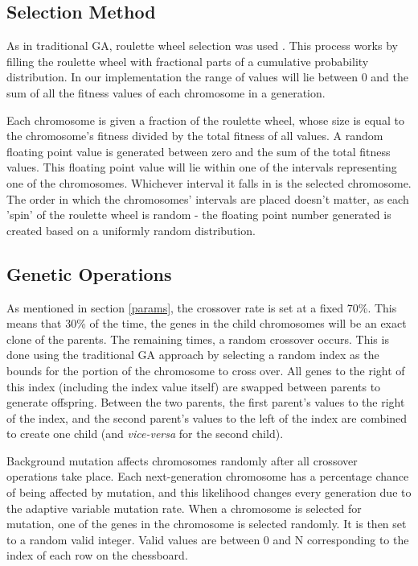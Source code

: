 \documentclass[conference]{IEEEtran}
\begin{document}
\subsection{Selection Method}
As in traditional GA, roulette wheel selection was used \cite{goldberg1991comparative}. This process works by filling the roulette wheel with fractional parts of a cumulative probability distribution. In our implementation the range of values will lie between 0 and the sum of all the fitness values of each chromosome in a generation.

Each chromosome is given a fraction of the roulette wheel, whose size is equal to the chromosome's fitness divided by the total fitness of all values. A random floating point value is generated between zero and the sum of the total fitness values. This floating point value will lie within one of the intervals representing one of the chromosomes. Whichever interval it falls in is the selected chromosome. The order in which the chromosomes' intervals are placed doesn't matter, as each 'spin' of the roulette wheel is random - the floating point number generated is created based on a uniformly random distribution.

\subsection{Genetic Operations}
As mentioned in section \ref{params}, the crossover rate is set at a fixed 70\%. This means that 30\% of the time, the genes in the child chromosomes will be an exact clone of the parents. The remaining times, a random crossover occurs. This is done using the traditional GA approach by selecting a random index as the bounds for the portion of the chromosome to cross over. All genes to the right of this index (including the index value itself) are swapped between parents to generate offspring. Between the two parents, the first parent's values to the right of the index, and the second parent's values to the left of the index are combined to create one child (and \textit{vice-versa} for the second child).

Background mutation affects chromosomes randomly after all crossover operations take place. Each next-generation chromosome has a percentage chance of being affected by mutation, and this likelihood changes every generation due to the adaptive variable mutation rate. When a chromosome is selected for mutation, one of the genes in the chromosome is selected randomly. It is then set to a random valid integer. Valid values are between 0 and N corresponding to the index of each row on the chessboard.
\end{document}
